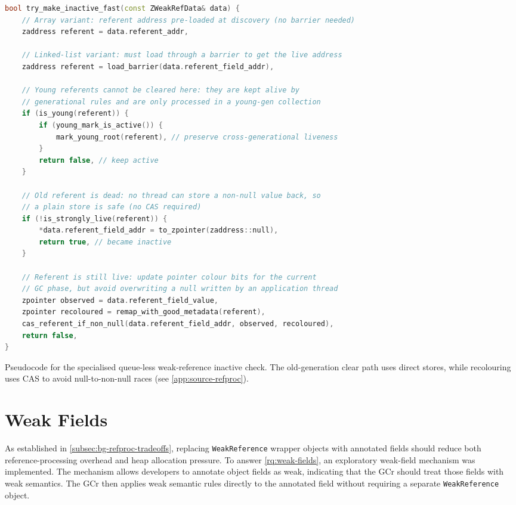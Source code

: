 \begin{listing}[t]
\begin{lstlisting}[language=C++]
bool try_make_inactive_fast(const ZWeakRefData& data) {
    // Array variant: referent address pre-loaded at discovery (no barrier needed)
    zaddress referent = data.referent_addr,

    // Linked-list variant: must load through a barrier to get the live address
    zaddress referent = load_barrier(data.referent_field_addr),

    // Young referents cannot be cleared here: they are kept alive by
    // generational rules and are only processed in a young-gen collection
    if (is_young(referent)) {
        if (young_mark_is_active()) {
            mark_young_root(referent), // preserve cross-generational liveness
        }
        return false, // keep active
    }

    // Old referent is dead: no thread can store a non-null value back, so
    // a plain store is safe (no CAS required)
    if (!is_strongly_live(referent)) {
        *data.referent_field_addr = to_zpointer(zaddress::null),
        return true, // became inactive
    }

    // Referent is still live: update pointer colour bits for the current
    // GC phase, but avoid overwriting a null written by an application thread
    zpointer observed = data.referent_field_value,
    zpointer recoloured = remap_with_good_metadata(referent),
    cas_referent_if_non_null(data.referent_field_addr, observed, recoloured),
    return false,
}
\end{lstlisting}
\caption[Optimised-clear-path fast inactive check]{Pseudocode for the specialised queue-less weak-reference inactive check. The old-generation clear path uses direct stores, while recolouring uses \ac{CAS} to avoid null-to-non-null races (see \cref{app:source-refproc}).}
\label{lst:gen-opt-fast-inactive}
\end{listing}

\section{Weak Fields}
\label{sec:di-wf}

As established in \cref{subsec:bg-refproc-tradeoffs}, replacing \texttt{WeakReference} wrapper objects with annotated fields should reduce both reference-processing overhead and heap allocation pressure. To answer \cref{rq:weak-fields}, an exploratory weak-field mechanism was implemented. The mechanism allows developers to annotate object fields as weak, indicating that the \ac{GCr} should treat those fields with weak semantics. The \ac{GCr} then applies weak semantic rules directly to the annotated field without requiring a separate \texttt{WeakReference} object.


